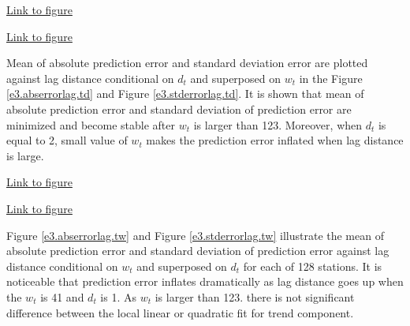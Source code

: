 \begin{framed}
\begin{center}
  \href{../plots/a1950/E3/tmax.absmeans.vs.lag.td.pdf}{Link to figure}
  \label{e3.abserrorlag.td}
\end{center}
\end{framed}

\begin{framed}
\begin{center}
  \href{../plots/a1950/E3/tmax.std.vs.lag.td.pdf}{Link to figure}
  \label{e3.stderrorlag.td}
\end{center}
\end{framed}

Mean of absolute prediction error and standard deviation error are plotted 
against lag distance conditional on $d_t$ and superposed on $w_t$ in the
Figure 
\href{../plots/a1950/E3/tmax.absmeans.vs.lag.td.pdf}{\ref*{e3.abserrorlag.td}} 
and Figure 
\href{../plots/a1950/E3/tmax.std.vs.lag.td.pdf}{\ref*{e3.stderrorlag.td}}. 
It is shown that mean of absolute prediction error and standard deviation of
prediction error
are minimized and become stable after $w_t$ is larger than 123. Moreover, when
$d_t$ is equal to 2, small value of $w_t$ makes the prediction error inflated
when lag distance is large. 

\begin{framed}
\begin{center}
  \href{../plots/a1950/E3/tmax.absmeans.vs.lag.tw.pdf}{Link to figure}
  \label{e3.abserrorlag.tw}
\end{center}
\end{framed}

\begin{framed}
\begin{center}
  \href{../plots/a1950/E3/tmax.std.vs.lag.tw.pdf}{Link to figure}
  \label{e3.stderrorlag.tw}
\end{center}
\end{framed}

Figure 
\href{../plots/a1950/E3/tmax.absmeans.vs.lag.tw.pdf}{\ref*{e3.abserrorlag.tw}} 
and Figure 
\href{../plots/a1950/E3/tmax.std.vs.lag.tw.pdf}{\ref*{e3.stderrorlag.tw}} 
illustrate the mean of absolute prediction error and standard deviation of 
prediction error against lag distance conditional on $w_t$ and superposed on 
$d_t$ for each of 128 stations. It is noticeable that prediction error inflates
dramatically as lag distance goes up when the $w_t$ is 41 and $d_t$ is 1.
As $w_t$ is larger than 123. there is not significant difference between the 
local linear or quadratic fit for trend component.

